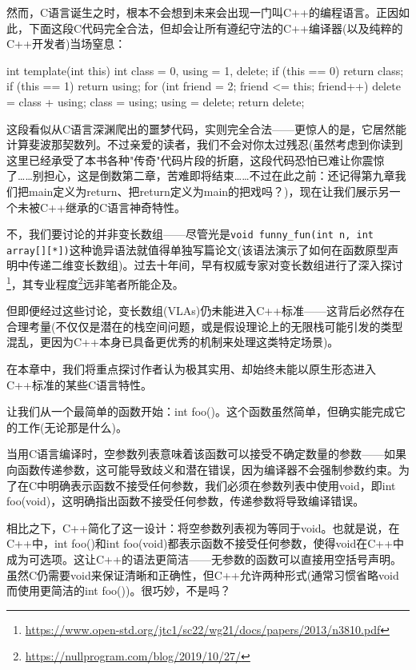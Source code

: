 然而，C语言诞生之时，根本不会想到未来会出现一门叫C++的编程语言。正因如此，下面这段C代码完全合法，但却会让所有遵纪守法的C++编译器(以及纯粹的C++开发者)当场窒息：

\begin{cpp}
int template(int this) {
  int class = 0, using = 1, delete;
  if (this == 0) return class;
  if (this == 1) return using;
  for (int friend = 2; friend <= this; friend++) {
    delete = class + using;
    class = using;
    using = delete;
  }
  return delete;
}
\end{cpp}

这段看似从C语言深渊爬出的噩梦代码，实则完全合法——更惊人的是，它居然能计算斐波那契数列。不过亲爱的读者，我们不会对你太过残忍(虽然考虑到你读到这里已经承受了本书各种"传奇"代码片段的折磨，这段代码恐怕已难让你震惊了……别担心，这是倒数第二章，苦难即将结束……不过在此之前：还记得第九章我们把main定义为return、把return定义为main的把戏吗？)，现在让我们展示另一个未被C++继承的C语言神奇特性。

不，我们要讨论的并非变长数组——尽管光是\verb|void funny_fun(int n, int array[][*])|这种诡异语法就值得单独写篇论文(该语法演示了如何在函数原型声明中传递二维变长数组)。过去十年间，早有权威专家对变长数组进行了深入探讨\footnote{\url{https://www.open-std.org/jtc1/sc22/wg21/docs/papers/2013/n3810.pdf}}，其专业程度\footnote{\url{https://nullprogram.com/blog/2019/10/27/}}远非笔者所能企及。

但即便经过这些讨论，变长数组(VLAs)仍未能进入C++标准——这背后必然存在合理考量(不仅仅是潜在的栈空间问题，或是假设理论上的无限栈可能引发的类型混乱，更因为C++本身已具备更优秀的机制来处理这类特定场景)。

在本章中，我们将重点探讨作者认为极其实用、却始终未能以原生形态进入C++标准的某些C语言特性。


让我们从一个最简单的函数开始：int foo()。这个函数虽然简单，但确实能完成它的工作(无论那是什么)。

当用C语言编译时，空参数列表意味着该函数可以接受不确定数量的参数——如果向函数传递参数，这可能导致歧义和潜在错误，因为编译器不会强制参数约束。为了在C中明确表示函数不接受任何参数，我们必须在参数列表中使用void，即int foo(void)，这明确指出函数不接受任何参数，传递参数将导致编译错误。

相比之下，C++简化了这一设计：将空参数列表视为等同于void。也就是说，在C++中，int foo()和int foo(void)都表示函数不接受任何参数，使得void在C++中成为可选项。这让C++的语法更简洁——无参数的函数可以直接用空括号声明。虽然C仍需要void来保证清晰和正确性，但C++允许两种形式(通常习惯省略void而使用更简洁的int foo())。很巧妙，不是吗？

